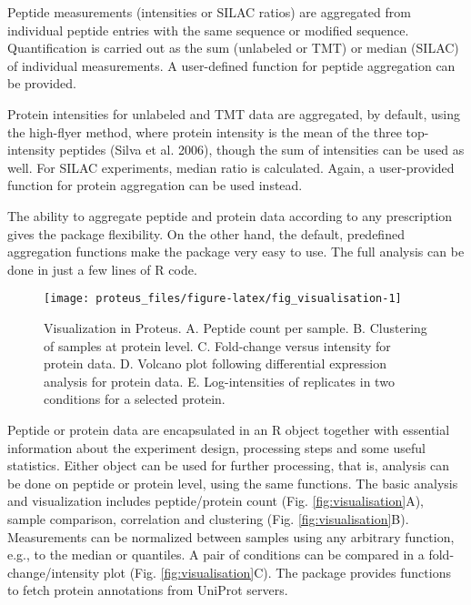 \documentclass[]{article}
\begin{document}
Peptide measurements (intensities or SILAC ratios) are aggregated from
individual peptide entries with the same sequence or modified sequence.
Quantification is carried out as the sum (unlabeled or TMT) or median
(SILAC) of individual measurements. A user-defined function for peptide
aggregation can be provided.

Protein intensities for unlabeled and TMT data are aggregated, by
default, using the high-flyer method, where protein intensity is the
mean of the three top-intensity peptides (Silva et al. 2006), though the
sum of intensities can be used as well. For SILAC experiments, median
ratio is calculated. Again, a user-provided function for protein
aggregation can be used instead.

The ability to aggregate peptide and protein data according to any
prescription gives the package flexibility. On the other hand, the
default, predefined aggregation functions make the package very easy to
use. The full analysis can be done in just a few lines of R code.

\begin{figure}[H]

{\centering \texttt{[image: proteus\_files/figure-latex/fig\_visualisation-1]} 

}

\caption{\label{fig:visualisation}Visualization in Proteus. A. Peptide count per sample. B. Clustering of samples at protein level. C. Fold-change versus intensity for protein data. D. Volcano plot following differential expression analysis for protein data. E. Log-intensities of replicates in two conditions for a selected protein.}\label{fig:fig_visualisation}
\end{figure}

Peptide or protein data are encapsulated in an R object together with
essential information about the experiment design, processing steps and
some useful statistics. Either object can be used for further
processing, that is, analysis can be done on peptide or protein level,
using the same functions. The basic analysis and visualization includes
peptide/protein count (Fig. \ref{fig:visualisation}A), sample
comparison, correlation and clustering (Fig. \ref{fig:visualisation}B).
Measurements can be normalized between samples using any arbitrary
function, e.g., to the median or quantiles. A pair of conditions can be
compared in a fold-change/intensity plot (Fig.
\ref{fig:visualisation}C). The package provides functions to fetch
protein annotations from UniProt servers.
\end{document}
